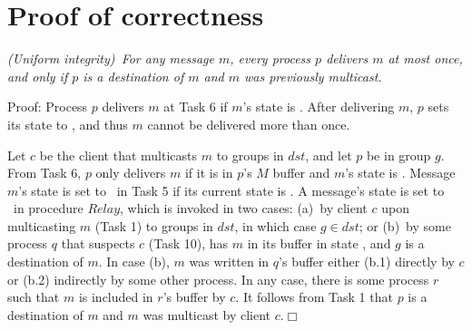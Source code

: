 
\newcommand{\Pend}{\ensuremath{\mathit{ToOrder}}\xspace}
\newcommand{\Done}{\ensuremath{\mathit{Ordered}}\xspace}
\newcommand{\Decided}{\ensuremath{\mathit{Decided}}\xspace}
\newcommand{\Buffer}{\ensuremath{\mathcal{B}}\xspace}

\clearpage
\section{Proof of correctness}

\begin{proposition}
\textit{(Uniform integrity)~For any message $m$, every process $p$ delivers $m$ at most once, and only if $p$ is a destination of $m$ and $m$ was previously multicast.}
\end{proposition}
\vspace{2mm}
\noindent
{\sc Proof:} 
Process $p$ delivers $m$ at Task 6 if $m$'s state is \ordered. 
After delivering $m$, $p$ sets its state to \done, and thus $m$ cannot be delivered more than once.

Let $c$ be the client that multicasts $m$ to groups in $dst$, and let $p$ be in group $g$. 
From Task 6, $p$ only delivers $m$ if it is in $p$'s $M$ buffer and $m$'s state is \ordered. 
Message $m$'s state is set to \ordered\ in Task 5 if its current state is \mcast.
A message's state is set to \mcast\ in procedure $Relay$, which is invoked in two cases:
(a)~by client $c$ upon multicasting $m$ (Task 1) to groups in $dst$, in which case $g \in dst$; or 
(b)~by some process $q$ that suspects $c$ (Task 10), has $m$ in its buffer in state \mcast, and $g$ is a destination of $m$.
In case (b), $m$ was written in $q$'s buffer either (b.1) directly by $c$ or (b.2) indirectly by some other process.
In any case, there is some process $r$ such that $m$ is included in $r$'s buffer by $c$.
It follows from Task 1 that $p$ is a destination of $m$ and $m$ was multicast by client $c$.\hfill$\Box$

